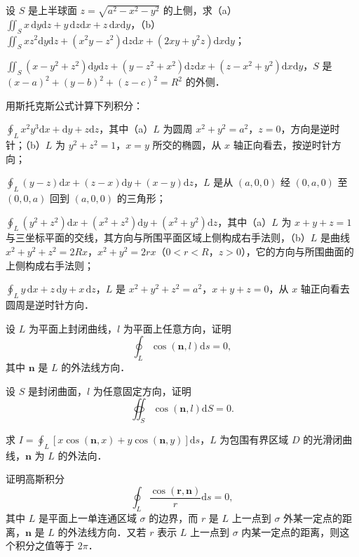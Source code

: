 \begin{xiti}
\begin{ziti}
\item 设 $S$ 是上半球面 $z=\sqrt{a^{2}-x^{2}-y^{2}}$ 的上侧，求（a）$\displaystyle\iint_{S}x\,\mathrm{d}y\mathrm{d}z+y\,\mathrm{d}z\mathrm{d}x+z\,\mathrm{d}x\mathrm{d}y$，（b）$\displaystyle\iint_{S}xz^{2}\mathrm{d}y\mathrm{d}z+(x^{2}y-z^{2})\mathrm{d}z\mathrm{d}x+(2xy+y^{2}z)\mathrm{d}x\mathrm{d}y$；
\item $\displaystyle\iint_{S}(x-y^{2}+z^{2})\mathrm{d}y\mathrm{d}z+(y-z^{2}+x^{2})\mathrm{d}z\mathrm{d}x+(z-x^{2}+y^{2})\mathrm{d}x\mathrm{d}y$，$S$ 是 $(x-a)^{2}+(y-b)^{2}+(z-c)^{2}=R^{2}$ 的外侧．
\end{ziti}
\item 用斯托克斯公式计算下列积分：
\begin{ziti}
\item $\displaystyle\oint_{L}x^{2}y^{3}\mathrm{d}x+\mathrm{d}y+z\mathrm{d}z$，其中（a）$L$ 为圆周 $x^{2}+y^{2}=a^{2}$，$z=0$，方向是逆时针；（b）$L$ 为 $y^{2}+z^{2}=1$，$x=y$ 所交的椭圆，从 $x$ 轴正向看去，按逆时针方向；
\item $\displaystyle\oint_{L}(y-z)\mathrm{d}x+(z-x)\mathrm{d}y+(x-y)\mathrm{d}z$，$L$ 是从 $(a,0,0)$ 经 $(0,a,0)$ 至 $(0,0,a)$ 回到 $(a,0,0)$ 的三角形；
\item $\displaystyle\oint_{L}(y^{2}+z^{2})\mathrm{d}x+(x^{2}+z^{2})\mathrm{d}y+(x^{2}+y^{2})\mathrm{d}z$，其中（a）$L$ 为 $x+y+z=1$ 与三坐标平面的交线，其方向与所围平面区域上侧构成右手法则，（b）$L$ 是曲线 $x^{2}+y^{2}+z^{2}=2Rx$，$x^{2}+y^{2}=2rx$（$0<r<R$，$z>0$），它的方向与所围曲面的上侧构成右手法则；
\item $\displaystyle\oint_{L}y\,\mathrm{d}x+z\,\mathrm{d}y+x\,\mathrm{d}z$，$L$ 是 $x^{2}+y^{2}+z^{2}=a^{2}$，$x+y+z=0$，从 $x$ 轴正向看去圆周是逆时针方向．
\end{ziti}
\item 设 $L$ 为平面上封闭曲线，$l$ 为平面上任意方向，证明
\[
\oint_{L}\cos(\bm{n},l)\mathrm{d}s=0,
\]
其中 $\bm{n}$ 是 $L$ 的外法线方向．
\item 设 $S$ 是封闭曲面，$l$ 为任意固定方向，证明
\[
\oiint_{S}\cos(\bm{n},l)\mathrm{d}S=0.
\]
\item 求 $I=\displaystyle\oint_{L}\left[x\cos(\bm{n},x)+y\cos(\bm{n},y)\right]\mathrm{d}s$，$L$ 为包围有界区域 $D$ 的光滑闭曲线，$\bm{n}$ 为 $L$ 的外法向．
\item 证明高斯积分
\[
\oint_{L}\frac{\cos(\bm{r},\bm{n})}{r}\mathrm{d}s=0,
\]
其中 $L$ 是平面上一单连通区域 $\sigma$ 的边界，而 $r$ 是 $L$ 上一点到 $\sigma$ 外某一定点的距离，$\bm{n}$ 是 $L$ 的外法线方向．又若 $r$ 表示 $L$ 上一点到 $\sigma$ 内某一定点的距离，则这个积分之值等于 $2\pi$．

\end{xiti}
